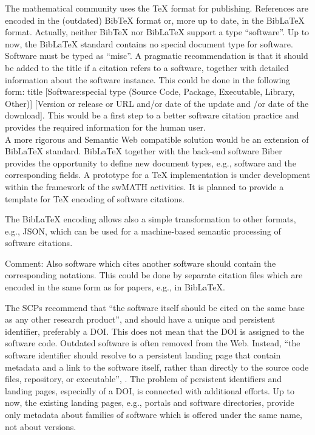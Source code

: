 \documentclass[12pt]{article}
\begin{document}
The mathematical community uses the {\TeX} format for publishing. References are encoded in the (outdated) Bib{\TeX} format or, more up to date, in the  Bib{\LaTeX} format. Actually, neither Bib{\TeX} nor Bib{\LaTeX}  support a type ``software''. Up to now, the Bib{\LaTeX} standard contains no special document type for software. Software must be typed as ``misc''. A pragmatic recommendation is that it should be added to the title if a citation
refers to a software, together with detailed information about the software instance. This could be done in the following form: title [Software:special type (Source Code, Package, Executable, Library, Other)] [Version or release or URL and/or date of the update and /or date of the download]. This would be a first step to a better software citation practice and provides the required information for the human user.\\
A more rigorous and Semantic Web compatible solution would be an extension of Bib{\LaTeX} standard. Bib{\LaTeX} together with the back-end software Biber provides the opportunity to define new document types, e.g., software and the corresponding fields.  A prototype for a {\TeX} implementation is under development within the framework of the swMATH activities. It is planned to provide a template for  {\TeX} encoding of software citations.

The Bib{\LaTeX} encoding allows also a simple transformation to other formats, e.g., JSON, which can be used for a machine-based semantic processing of software citations.

Comment: Also software which cites another software should contain the corresponding notations. This could be done by separate citation files which are  encoded in the same form as for papers, e.g., in Bib\LaTeX.

The SCPs recommend that ``the software itself should be cited on the same base as any other research product'', and should have a unique and persistent identifier, preferably a DOI. This does not mean that the DOI is assigned to the software code. Outdated software is often removed from the Web. Instead, ``the software identifier should resolve to a persistent landing page that contain metadata and a link to the software itself, rather than directly to the source code files, repository, or executable'', \cite{SoftwareCitationPrinciples}.  The problem of persistent identifiers and landing pages, especially of a DOI, is connected with additional efforts. Up to now, the existing landing pages, e.g.,  portals and software directories, provide only metadata about families of software which is offered under the same name, not about versions.
\end{document}
